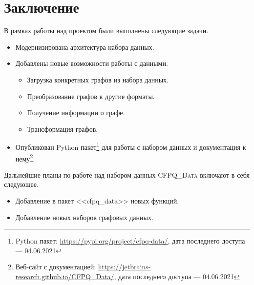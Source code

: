 \section{Заключение}
В рамках работы над проектом были выполнены следующие задачи.
\begin{itemize}
	\item[\checkmark] Модернизирована архитектура набора данных.
	\item[\checkmark] Добавлены новые возможности работы с данными.
	\begin{itemize}
        \item[\checkmark] Загрузка конкретных графов из набора данных.
        \item[\checkmark] Преобразование графов в другие форматы.
        \item[\checkmark] Получение информации о графе.
        \item[\checkmark] Трансформация графов.
    \end{itemize}
	\item[\checkmark] Опубликован Python пакет\footnote{Python пакет: \url{https://pypi.org/project/cfpq-data/}, дата последнего доступа --- 04.06.2021} для работы с набором данных и документация к нему\footnote{Веб-сайт с документацией: \url{https://jetbrains-research.github.io/CFPQ_Data/}, дата последнего доступа --- 04.06.2021}.
\end{itemize}

Дальнейшие планы по работе над набором данных \textsc{CFPQ\_Data} включают в себя следующее.
\begin{itemize}
    \item Добавление в пакет <<cfpq\_data>> новых функций.
    \item Добавление новых наборов графовых данных.
\end{itemize}